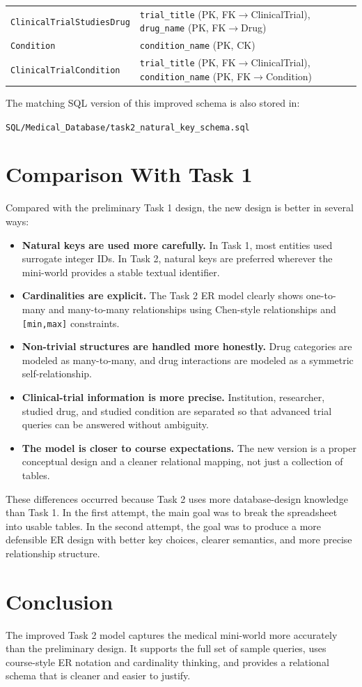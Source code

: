 \documentclass[12pt,a4paper]{article}
\begin{document}
\begin{longtable}{p{} p{}}
\texttt{ClinicalTrialStudiesDrug} & \texttt{trial\_title} (PK, FK$\rightarrow$ClinicalTrial), \texttt{drug\_name} (PK, FK$\rightarrow$Drug) \\
\texttt{Condition} & \texttt{condition\_name} (PK, CK) \\
\texttt{ClinicalTrialCondition} & \texttt{trial\_title} (PK, FK$\rightarrow$ClinicalTrial), \texttt{condition\_name} (PK, FK$\rightarrow$Condition) \\
\bottomrule
\end{longtable}

The matching SQL version of this improved schema is also stored in:

\texttt{SQL/Medical\_Database/task2\_natural\_key\_schema.sql}

\section{Comparison With Task 1}
Compared with the preliminary Task 1 design, the new design is better in several ways:

\begin{itemize}[leftmargin=1.5em]
    \item \textbf{Natural keys are used more carefully.} In Task 1, most entities used surrogate integer IDs. In Task 2, natural keys are preferred wherever the mini-world provides a stable textual identifier.
    \item \textbf{Cardinalities are explicit.} The Task 2 ER model clearly shows one-to-many and many-to-many relationships using Chen-style relationships and \texttt{[min,max]} constraints.
    \item \textbf{Non-trivial structures are handled more honestly.} Drug categories are modeled as many-to-many, and drug interactions are modeled as a symmetric self-relationship.
    \item \textbf{Clinical-trial information is more precise.} Institution, researcher, studied drug, and studied condition are separated so that advanced trial queries can be answered without ambiguity.
    \item \textbf{The model is closer to course expectations.} The new version is a proper conceptual design and a cleaner relational mapping, not just a collection of tables.
\end{itemize}

These differences occurred because Task 2 uses more database-design knowledge than Task 1. In the
first attempt, the main goal was to break the spreadsheet into usable tables. In the second attempt,
the goal was to produce a more defensible ER design with better key choices, clearer semantics, and
more precise relationship structure.

\section{Conclusion}
The improved Task 2 model captures the medical mini-world more accurately than the preliminary
design. It supports the full set of sample queries, uses course-style ER notation and cardinality
thinking, and provides a relational schema that is cleaner and easier to justify.
\end{document}
